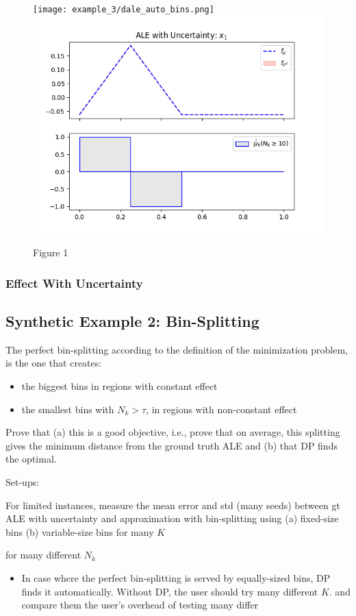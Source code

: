 \documentclass[twoside]{article}
\begin{document}
\begin{figure}[h]
  \centering
  \texttt{[image: example\_3/dale\_auto\_bins.png]}
  \includegraphics[width=.23\textwidth]{example_3/pdp_ice.png}
  \caption{Figure 1}
  \label{fig:ex-synth-1-1}
\end{figure}

\subsubsection{Effect With Uncertainty}




\subsection{Synthetic Example 2: Bin-Splitting}

The perfect bin-splitting according to the definition of the
minimization problem, is the one that creates:

\begin{itemize}
\item the biggest bins in regions with constant effect
\item the smallest bins with \(N_k > \tau\), in regions with non-constant effect
\end{itemize}

Prove that (a) this is a good objective, i.e., prove that on average,
this splitting gives the minimum distance from the ground truth ALE
and (b) that DP finds the optimal.

Set-ups:

For limited instances, measure the mean error and std (many seeds)
between gt ALE with uncertainty and approximation with bin-splitting
using (a) fixed-size bins (b) variable-size bins for many \(K\)

for many different \(N_k\)

\begin{itemize}
\item In case where the perfect bin-splitting is served by
  equally-sized bins, DP finds it automatically. Without DP, the user
  should try many different \(K\). and compare them the user's overhead of
  testing many differ
\end{itemize}
\end{document}
